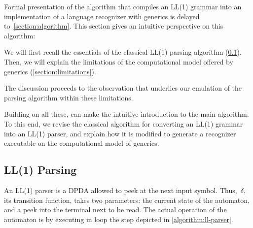 Formal presentation of the algorithm that compiles an LL(1) grammar into an implementation of a
  language recognizer with \Java generics
  is delayed to~\cref{section:algorithm}. 
This section gives an intuitive perspective on this algorithm:

We will first recall the essentials of the classical LL(1) parsing algorithm (\cref{section:essentials}).
Then, we will explain the limitations of the computational model
  offered by \Java generics (\cref{section:limitations}).

The discussion proceeds to the observation
  that underlies our emulation of the parsing algorithm
  within these limitations.

Building on all these,  can
  make the intuitive introduction to the main algorithm.
To this end, we revise the classical algorithm for converting
  an LL(1) grammar into an LL(1) parser, and explain
  how it is modified to generate a recognizer executable
  on the computational model of \Java generics.

\subsection{LL(1) Parsing}
\label{section:essentials}
An LL(1) parser is a DPDA allowed to peek at the next input symbol.
Thus,~$δ$, its transition function, takes two parameters: the current
  state of the automaton, and a peek into the terminal next to be read.
The actual operation of the automaton is by executing in loop the step
  depicted in \cref{algorithm:ll-parser}.

